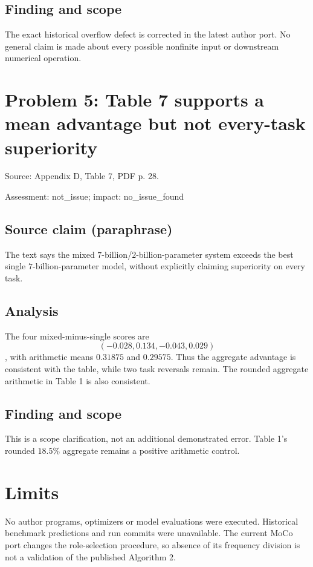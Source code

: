 \documentclass[11pt]{article}
\begin{document}
\subsection*{Finding and scope}

The exact historical overflow defect is corrected in the latest author port. No general claim is made about every possible nonfinite input or downstream numerical operation.

\section*{Problem 5: Table 7 supports a mean advantage but not every-task superiority}

Source: Appendix D, Table 7, PDF p. 28.

Assessment: not\_issue; impact: no\_issue\_found

\subsection*{Source claim (paraphrase)}

The text says the mixed \(7\)-billion/\(2\)-billion-parameter system exceeds the best single \(7\)-billion-parameter model, without explicitly claiming superiority on every task.

\subsection*{Analysis}

The four mixed-minus-single scores are \[(-0.028,0.134,-0.043,0.029)\], with arithmetic means \(0.31875\) and \(0.29575\). Thus the aggregate advantage is consistent with the table, while two task reversals remain. The rounded aggregate arithmetic in Table 1 is also consistent.

\subsection*{Finding and scope}

This is a scope clarification, not an additional demonstrated error. Table 1’s rounded \(18.5\%\) aggregate remains a positive arithmetic control.

\section*{Limits}

No author programs, optimizers or model evaluations were executed. Historical benchmark predictions and run commits were unavailable. The current MoCo port changes the role-selection procedure, so absence of its frequency division is not a validation of the published Algorithm 2.\par
\end{document}
